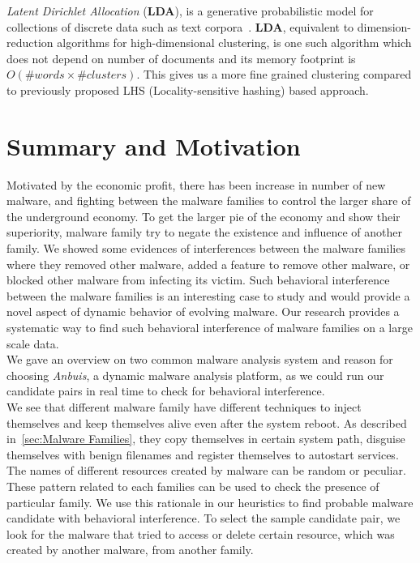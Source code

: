 \textit{Latent Dirichlet Allocation} (\textbf{LDA}), is a generative probabilistic model for collections of discrete data such as text corpora~\cite[LDA]{Blei}.
\textbf{LDA}, equivalent to dimension-reduction algorithms for high-dimensional clustering, is one such algorithm which does not depend on number of documents and its memory footprint is $O(\#words\times \#clusters)$.
This gives us a more fine grained clustering compared to previously proposed LHS (Locality-sensitive hashing) based approach.\\

\section{Summary and Motivation}
\label{sec:Motivation}
Motivated by the economic profit, there has been increase in number of new malware, and fighting between the malware families to control the larger share of the underground economy.
To get the larger pie of the economy and show their superiority, malware family try to negate the existence and influence of another family.
We showed some evidences of interferences between the malware families where they removed other malware, added a feature to remove other malware, or blocked other malware from infecting its victim.
Such behavioral interference between the malware families is an interesting case to study and would provide a novel aspect of dynamic behavior of evolving malware.
Our research provides a systematic way to find such behavioral interference of malware families on a large scale data.
\\
We gave an overview on two common malware analysis system and reason for choosing \emph{Anbuis}, a dynamic malware analysis platform, as we could run our candidate pairs in real time to check for behavioral interference.\\
We see that different malware family have different techniques to inject themselves and keep themselves alive even after the system reboot.
As described in~\autoref{sec:Malware Families}, they copy themselves in certain system path, disguise themselves with benign filenames and register themselves to autostart services.
The names of different resources created by malware can be random or peculiar.
These pattern related to each families can be used to check the presence of particular family.
We use this rationale in our heuristics to find probable malware candidate with behavioral interference.
To select the sample candidate pair, we look for the malware that tried to access or delete certain resource, which was created by another malware, from another family.

